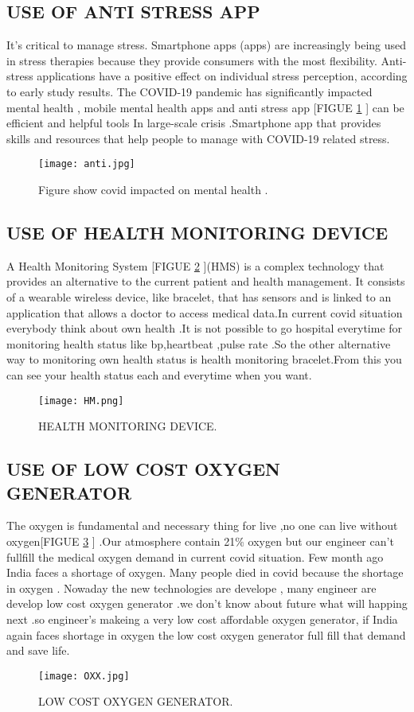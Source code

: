 \documentclass[12pt]{article}
\begin{document}
\subsection{USE OF ANTI STRESS  APP}
It's critical to manage stress. Smartphone apps (apps) are increasingly being used in stress therapies because they provide consumers with the most flexibility. Anti-stress applications have a positive effect on individual stress perception, according to early study results. The COVID-19 pandemic has significantly impacted mental health
, mobile mental health apps and anti stress app [FIGUE \ref{fig_anti} ] can be efficient and helpful tools In large-scale crisis .Smartphone app that provides skills and resources that help people to manage with COVID-19 related stress.
\begin{figure}[h]
\centering
\texttt{[image: anti.jpg]}
\caption{Figure show covid  impacted on mental health .}
\label{fig_anti}
\end{figure}

\clearpage
\subsection{USE OF HEALTH MONITORING DEVICE }
A Health Monitoring System [FIGUE \ref{fig_HM} ](HMS) is a complex technology that provides an alternative to the current patient and health management. It consists of a wearable wireless device, like bracelet, that has sensors and is linked to an application that allows a doctor to access medical data.In current covid situation everybody think about own health .It is not possible to go  hospital everytime for  monitoring health status like bp,heartbeat ,pulse rate .So the other alternative way to monitoring own health status  is health monitoring bracelet.From this you can see your health status each and everytime when you want.  
\begin{figure}[h]
\centering
\texttt{[image: HM.png]}
\caption{HEALTH MONITORING DEVICE.}
\label{fig_HM}
\end{figure}
\clearpage
\subsection{USE OF LOW COST OXYGEN GENERATOR } 
The oxygen is fundamental and necessary thing for live ,no one can live without oxygen[FIGUE \ref{fig_OXX} ] .Our atmosphere contain  21\% oxygen but our engineer can't fullfill the medical oxygen demand in current covid situation. Few month ago India faces a shortage of oxygen. Many people died in covid because the shortage in oxygen . Nowaday  the new technologies are develope , many engineer are develop low cost oxygen generator .we don't know about future what will happing next .so engineer's makeing a very low cost affordable oxygen generator, if  India again  faces shortage in oxygen the low  cost oxygen generator full fill that demand and save life. 
\begin{figure}[h]
\centering
\texttt{[image: OXX.jpg]}
\caption{LOW COST OXYGEN GENERATOR.}
\label{fig_OXX}
\end{figure}
 
\end{document}
